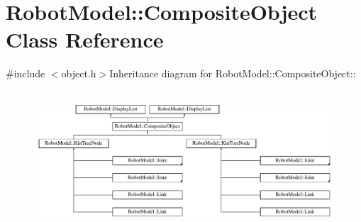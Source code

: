 \hypertarget{class_robot_model_1_1_composite_object}{
\section{RobotModel::CompositeObject Class Reference}
\label{class_robot_model_1_1_composite_object}
}


{\ttfamily \#include $<$object.h$>$}Inheritance diagram for RobotModel::CompositeObject::\begin{figure}[H]
\begin{center}
\leavevmode
\includegraphics[height=5.21277cm]{class_robot_model_1_1_composite_object}
\end{center}
\end{figure}
